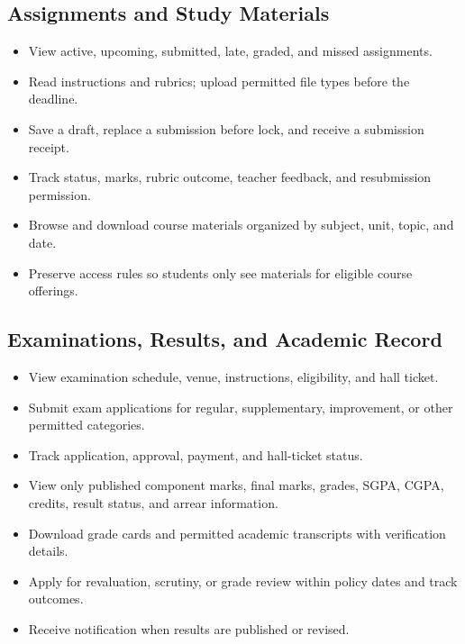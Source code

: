 \documentclass[10pt,a4paper]{article}
\begin{document}
\subsection{Assignments and Study Materials}
\begin{itemize}
  \item View active, upcoming, submitted, late, graded, and missed assignments.
  \item Read instructions and rubrics; upload permitted file types before the deadline.
  \item Save a draft, replace a submission before lock, and receive a submission receipt.
  \item Track status, marks, rubric outcome, teacher feedback, and resubmission permission.
  \item Browse and download course materials organized by subject, unit, topic, and date.
  \item Preserve access rules so students only see materials for eligible course offerings.
\end{itemize}

\subsection{Examinations, Results, and Academic Record}
\begin{itemize}
  \item View examination schedule, venue, instructions, eligibility, and hall ticket.
  \item Submit exam applications for regular, supplementary, improvement, or other permitted categories.
  \item Track application, approval, payment, and hall-ticket status.
  \item View only published component marks, final marks, grades, SGPA, CGPA, credits,
        result status, and arrear information.
  \item Download grade cards and permitted academic transcripts with verification details.
  \item Apply for revaluation, scrutiny, or grade review within policy dates and track outcomes.
  \item Receive notification when results are published or revised.
\end{itemize}
\end{document}
